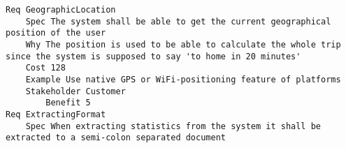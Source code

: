 

\begin{lstlisting}
Req GeographicLocation
	Spec The system shall be able to get the current geographical position of the user
	Why The position is used to be able to calculate the whole trip since the system is supposed to say 'to home in 20 minutes' 
	Cost 128
	Example Use native GPS or WiFi-positioning feature of platforms
	Stakeholder Customer
		Benefit 5
Req ExtractingFormat
	Spec When extracting statistics from the system it shall be extracted to a semi-colon separated document

\end{lstlisting}